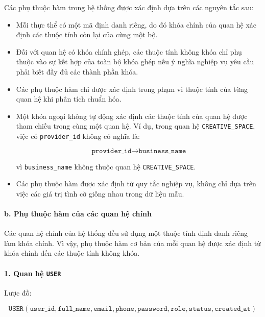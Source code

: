 Các phụ thuộc hàm trong hệ thống được xác định dựa trên các nguyên tắc sau:

\begin{itemize}
\item Mỗi thực thể có một mã định danh riêng, do đó khóa chính của quan hệ xác định các thuộc tính còn lại của cùng một bộ.

\item Đối với quan hệ có khóa chính ghép, các thuộc tính không khóa chỉ phụ thuộc vào sự kết hợp của toàn bộ khóa ghép nếu ý nghĩa nghiệp vụ yêu cầu phải biết đầy đủ các thành phần khóa.

\item Các phụ thuộc hàm chỉ được xác định trong phạm vi thuộc tính của từng quan hệ khi phân tích chuẩn hóa.

\item Một khóa ngoại không tự động xác định các thuộc tính của quan hệ được tham chiếu trong cùng một quan hệ. Ví dụ, trong quan hệ \texttt{CREATIVE\_SPACE}, việc có \texttt{provider\_id} không có nghĩa là:

\[
\texttt{provider\_id} \rightarrow \texttt{business\_name}
\]

vì \texttt{business\_name} không thuộc quan hệ \texttt{CREATIVE\_SPACE}.

\item Các phụ thuộc hàm được xác định từ quy tắc nghiệp vụ, không chỉ dựa trên việc các giá trị tình cờ giống nhau trong dữ liệu mẫu.

\end{itemize}

\paragraph{b. Phụ thuộc hàm của các quan hệ chính}\mbox{}\par

Các quan hệ chính của hệ thống đều sử dụng một thuộc tính định danh riêng làm khóa chính. Vì vậy, phụ thuộc hàm cơ bản của mỗi quan hệ được xác định từ khóa chính đến các thuộc tính không khóa.

\paragraph{1. Quan hệ \texttt{USER}}\mbox{}\par

Lược đồ:

$$ \texttt{USER}(\texttt{user\_id}, \texttt{full\_name}, \texttt{email}, \texttt{phone}, \texttt{password}, \texttt{role}, \texttt{status}, \texttt{created\_at}) $$

